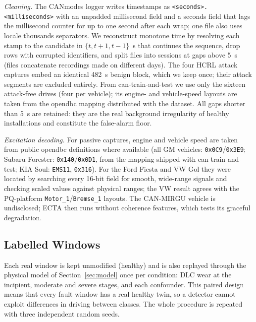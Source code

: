 \emph{Cleaning.} The CANmodes logger writes timestamps as
\texttt{<seconds>.<milliseconds>} with an unpadded millisecond field and a
seconds field that lags the millisecond counter for up to one second after
each wrap; one file also uses locale thousands separators. We reconstruct
monotone time by resolving each stamp to the candidate in
$\{t,t+1,t-1\}$~s that continues the sequence, drop rows with corrupted
identifiers, and split files into sessions at gaps above 5~s (files
concatenate recordings made on different days). The four HCRL attack
captures embed an identical 482~s benign block, which we keep once; their
attack segments are excluded entirely. From can-train-and-test we use only
the sixteen attack-free drives (four per vehicle); its engine- and
vehicle-speed layouts are taken from the opendbc mapping distributed with
the dataset. All gaps shorter than 5~s are
retained: they are the real background irregularity of healthy
installations and constitute the false-alarm floor.

\emph{Excitation decoding.} For passive captures, engine and vehicle speed
are taken from public opendbc definitions where available (all GM
vehicles: \texttt{0x0C9}/\texttt{0x3E9}; Subaru Forester:
\texttt{0x140}/\texttt{0x0D1}, from the mapping shipped with
can-train-and-test; KIA Soul: \texttt{EMS11}, \texttt{0x316}). For the
Ford Fiesta and VW Gol they were located by searching every 16-bit field
for smooth, wide-range signals and checking scaled values against physical
ranges; the VW result agrees with the PQ-platform
\texttt{Motor\_1}/\texttt{Bremse\_1} layouts. The CAN-MIRGU vehicle is
undisclosed; ECTA then runs without coherence features, which tests its
graceful degradation.

\subsection{Labelled Windows}
Each real window is kept unmodified (healthy) and is also replayed through
the physical model of Section~\ref{sec:model} once per condition: DLC wear
at the incipient, moderate and severe stages, and each confounder. This
paired design means that every fault window has a real healthy twin, so a
detector cannot exploit differences in driving between classes. The whole
procedure is repeated with three independent random seeds.

